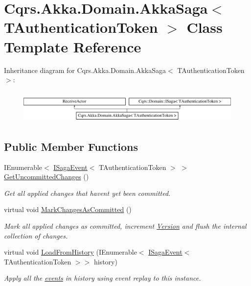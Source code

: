 \hypertarget{classCqrs_1_1Akka_1_1Domain_1_1AkkaSaga}{}\section{Cqrs.\+Akka.\+Domain.\+Akka\+Saga$<$ T\+Authentication\+Token $>$ Class Template Reference}
\label{classCqrs_1_1Akka_1_1Domain_1_1AkkaSaga}
Inheritance diagram for Cqrs.\+Akka.\+Domain.\+Akka\+Saga$<$ T\+Authentication\+Token $>$\+:\begin{figure}[H]
\begin{center}
\leavevmode
\includegraphics[height=1.696970cm]{classCqrs_1_1Akka_1_1Domain_1_1AkkaSaga}
\end{center}
\end{figure}
\subsection*{Public Member Functions}
\begin{DoxyCompactItemize}
\item 
I\+Enumerable$<$ \hyperlink{interfaceCqrs_1_1Events_1_1ISagaEvent}{I\+Saga\+Event}$<$ T\+Authentication\+Token $>$ $>$ \hyperlink{classCqrs_1_1Akka_1_1Domain_1_1AkkaSaga_ac88061e29e3e2223db31ce9075835b46_ac88061e29e3e2223db31ce9075835b46}{Get\+Uncommitted\+Changes} ()
\begin{DoxyCompactList}\small\item\em Get all applied changes that haven\textquotesingle{}t yet been committed. \end{DoxyCompactList}\item 
virtual void \hyperlink{classCqrs_1_1Akka_1_1Domain_1_1AkkaSaga_a83269fac4653cca097461e924feaea7f_a83269fac4653cca097461e924feaea7f}{Mark\+Changes\+As\+Committed} ()
\begin{DoxyCompactList}\small\item\em Mark all applied changes as committed, increment \hyperlink{classCqrs_1_1Akka_1_1Domain_1_1AkkaSaga_a3fda31a3857e12a1aed60f4a4f04edd1_a3fda31a3857e12a1aed60f4a4f04edd1}{Version} and flush the internal collection of changes. \end{DoxyCompactList}\item 
virtual void \hyperlink{classCqrs_1_1Akka_1_1Domain_1_1AkkaSaga_a40b859bc15c2f7c87a21b07f9bc9548c_a40b859bc15c2f7c87a21b07f9bc9548c}{Load\+From\+History} (I\+Enumerable$<$ \hyperlink{interfaceCqrs_1_1Events_1_1ISagaEvent}{I\+Saga\+Event}$<$ T\+Authentication\+Token $>$$>$ history)
\begin{DoxyCompactList}\small\item\em Apply all the \hyperlink{}{events} in {\itshape history}  using event replay to this instance. \end{DoxyCompactList}\end{DoxyCompactItemize}

